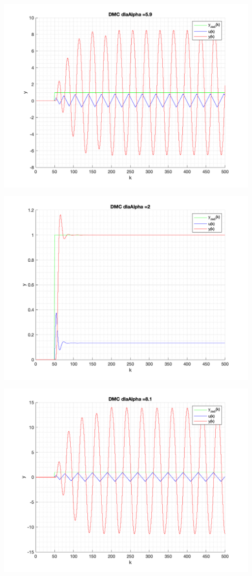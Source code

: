 \documentclass[a4paper, 11pt]{article}
\begin{document}
\begin{enumerate}
 \includegraphics[width=\linewidth]{./ModelsDodatkowe_Alpha/P4_DMC_Alpha_5_9_png.png} 
 
 \includegraphics[width=\linewidth]{./ModelsDodatkowe_Alpha/P4_DMC_Alpha_2_png.png} 
 
 \includegraphics[width=\linewidth]{./ModelsDodatkowe_Alpha/P4_DMC_Alpha_8_1_png.png} 
 

\end{enumerate}
\end{document}
